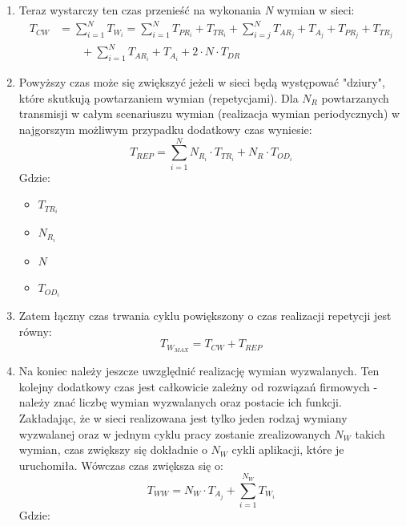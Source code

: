 \documentclass[a4paper,twoside]{article}
\begin{document}
\begin{enumerate}
		\item Teraz wystarczy ten czas przenieść na wykonania \emph{N} wymian w sieci:
		\begin{align}
			T_{CW} &= \sum_{i=1}^{N}{T_{W_i}}=
			\sum_{i=1}^{N}{{T_{PR_i} + T_{TR_i}}} + 
		 	\sum_{i=j}^{N}{T_{AR_j}+T_{A_j}+T_{PR_j}+T_{TR_j}} \nonumber \\
			&\qquad {} + \sum_{i=1}^{N}{T_{AR_i}+T_{A_i}} +
			2\cdot N\cdot T_{DR}
		\end{align}
		\item Powyższy czas może się zwiększyć jeżeli w sieci będą występować "dziury", które skutkują powtarzaniem wymian (repetycjami). Dla $ N_R $ powtarzanych transmisji w całym scenariuszu wymian (realizacja wymian periodycznych) w najgorszym możliwym przypadku dodatkowy czas wyniesie:
		\begin{equation}
			T_{REP} = \sum_{i=1}^{N}{N_{R_i}\cdot T_{TR_i}+N_R\cdot T_{OD_i}}
		\end{equation}
		Gdzie:
		\begin{itemize}
			\item $ T_{TR_i} $ 
			\item $ N_{R_i} $ 
			\item $ N $ 
			\item $ T_{OD_i} $ 
		\end{itemize}
		\item Zatem łączny czas trwania cyklu powiększony o czas realizacji repetycji jest równy:
		\begin{equation}
			T_{W_{MAX}}=T_{CW}+T_{REP}
		\end{equation}
		\item Na koniec należy jeszcze uwzględnić realizację wymian wyzwalanych. Ten kolejny dodatkowy czas jest całkowicie zależny od rozwiązań firmowych - należy znać liczbę wymian wyzwalanych oraz postacie ich funkcji.\\
		Zakładając, że w sieci realizowana jest tylko jeden rodzaj wymiany wyzwalanej oraz w jednym cyklu pracy zostanie zrealizowanych $ N_W $ takich wymian, czas zwiększy się dokładnie o $ N_W $ cykli aplikacji, które je uruchomiła. Wówczas czas zwiększa się o:
		\begin{equation}
			T_{WW} = N_W\cdot T_{A_j} + \sum_{i=1}^{N_W}{T_{W_i}}
		\end{equation}
		Gdzie:
		\begin{itemize}

\end{itemize}
\end{enumerate}
\end{document}
